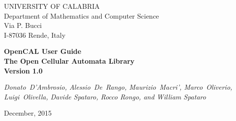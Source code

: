 \thispagestyle{empty}

\newcommand{\HS}[1][1.]{\hspace{\stretch{#1}}}
\begin{center}


\huge{UNIVERSITY OF CALABRIA}\\
\vspace*{0.25cm}
\large{Department of Mathematics and Computer Science}\\
\normalsize{Via P. Bucci\\
I-87036 Rende, Italy\\
\vspace*{0.25cm} \HS \hrulefill \HS}



\vspace*{3.5cm}

\Huge{\textbf{OpenCAL User Guide}}\\
\vspace*{0.2cm}
\large{\textbf{The Open Cellular Automata Library}}\\
\vspace*{0.7cm}
\Large{\textbf{Version 1.0}}
\vspace*{1cm}


\vspace*{1cm}

\normalsize{\textit{Donato~D'Ambrosio, Alessio~De~Rango, Maurizio~Macri', Marco~Oliverio, Luigi~Olivella,
 Davide Spataro, Rocco Rongo, and William Spataro}}

\vspace*{3.5cm}

\normalsize{December, 2015}

\vspace*{2.0cm}



\end{center}
